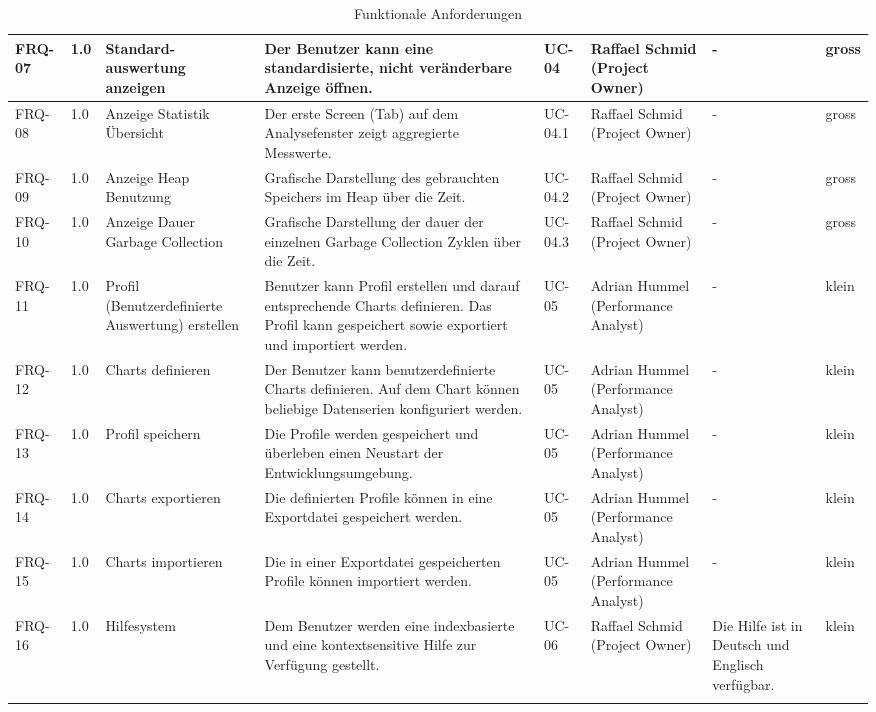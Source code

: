 \begin{landscape}
\begin{longtable}{|p{1.5cm}|p{0.7cm}|p{2.5cm}|p{3.9cm}|p{1.2cm}|p{2.5cm}|p{3.3cm}|p{0.8cm}|}
   FRQ-07 & 1.0 & Standard-auswertung anzeigen & Der Benutzer kann eine standardisierte, nicht veränderbare Anzeige öffnen. & UC-04 & Raffael Schmid (Project Owner) & - & gross \\\hline

   FRQ-08 & 1.0 &  Anzeige Statistik Übersicht & Der erste Screen (Tab) auf dem Analysefenster zeigt aggregierte Messwerte. & UC-04.1 &  Raffael Schmid (Project Owner) & - & gross \\\hline

   FRQ-09 & 1.0 & Anzeige Heap Benutzung  & Grafische Darstellung des gebrauchten Speichers im Heap über die Zeit. & UC-04.2 &Raffael Schmid (Project Owner) & - & gross \\\hline
   FRQ-10 & 1.0 & Anzeige Dauer Garbage Collection  & Grafische Darstellung der dauer der einzelnen Garbage Collection Zyklen über die Zeit. & UC-04.3 & Raffael Schmid (Project Owner) & - & gross \\\hline

   FRQ-11 & 1.0 & Profil (Benutzerdefinierte Auswertung) erstellen & Benutzer kann Profil erstellen und darauf entsprechende Charts definieren. Das Profil kann gespeichert sowie exportiert und importiert werden.& UC-05 & Adrian Hummel (Performance Analyst) & - & klein \\\hline

FRQ-12 & 1.0 & Charts definieren & Der Benutzer kann benutzerdefinierte Charts definieren. Auf dem Chart können beliebige Datenserien konfiguriert werden. & UC-05 & Adrian Hummel (Performance Analyst) & - & klein \\\hline

FRQ-13 & 1.0 & Profil speichern & Die Profile werden gespeichert und überleben einen Neustart der Entwicklungsumgebung. & UC-05 & Adrian Hummel (Performance Analyst) & - & klein \\\hline
FRQ-14 & 1.0 & Charts exportieren & Die definierten Profile können in eine Exportdatei gespeichert werden. & UC-05 & Adrian Hummel (Performance Analyst) & - & klein \\\hline
FRQ-15 & 1.0 & Charts importieren & Die in einer Exportdatei gespeicherten Profile können importiert werden.& UC-05 & Adrian Hummel (Performance Analyst) & - & klein \\\hline


  FRQ-16 & 1.0 & Hilfesystem &  Dem Benutzer werden eine indexbasierte und eine kontextsensitive Hilfe zur Verfügung gestellt. & UC-06 & Raffael Schmid (Project Owner) & Die Hilfe ist in Deutsch und Englisch verfügbar. & klein \\\hline
\caption{Funktionale Anforderungen}
\end{longtable}
\end{landscape}


